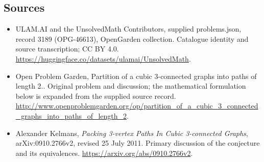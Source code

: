 \documentclass[11pt,a4paper]{article}
\begin{document}
\subsection{Sources}
\begin{itemize}
\item[S1] ULAM.AI and the UnsolvedMath Contributors, supplied problems.json, record 3189 (OPG-46613), OpenGarden collection. Catalogue identity and source transcription; CC BY 4.0.
\url{https://huggingface.co/datasets/ulamai/UnsolvedMath}.
\item[S2] Open Problem Garden, Partition of a cubic 3-connected graphs into paths of length 2.. Original problem and discussion; the mathematical formulation below is expanded from the supplied source record.
\url{http://www.openproblemgarden.org/op/partition_of_a_cubic_3_connected_graphs_into_paths_of_length_2}.
\item[S3] Alexander Kelmans, \emph{Packing 3-vertex Paths In Cubic 3-connected Graphs}, arXiv:0910.2766v2, revised 25 July 2011. Primary discussion of the conjecture and its equivalences.
\url{https://arxiv.org/abs/0910.2766v2}.
\end{itemize}
\end{document}
